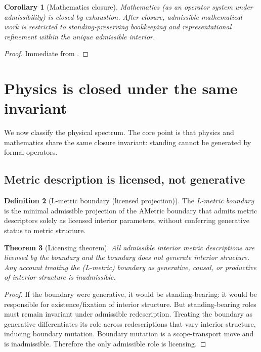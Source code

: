 \documentclass[11pt]{article}
\newtheorem{theorem}{Theorem}[section]
\newtheorem{corollary}[theorem]{Corollary}
\theoremstyle{definition}
\newtheorem{definition}[theorem]{Definition}
\begin{document}
\begin{corollary}[Mathematics closure]
\label{cor:math-closed}
Mathematics (as an operator system under admissibility) is closed by exhaustion.
After closure, admissible mathematical work is restricted to standing-preserving bookkeeping and representational refinement within the unique admissible interior.
\end{corollary}

\begin{proof}
Immediate from .
\end{proof}

\section{Physics is closed under the same invariant}
\label{sec:physics}

We now classify the physical spectrum.
The core point is that physics and mathematics share the same closure invariant: standing cannot be generated by formal operators.

\subsection{Metric description is licensed, not generative}

\begin{definition}[L-metric boundary (licensed projection)]
The \emph{L-metric boundary} is the minimal admissible projection of the AMetric boundary that admits metric descriptors solely as licensed interior parameters, without conferring generative status to metric structure.
\end{definition}

\begin{theorem}[Licensing theorem]
\label{thm:licensing}
All admissible interior metric descriptions are licensed by the boundary and the boundary does not generate interior structure.
Any account treating the (L-metric) boundary as generative, causal, or productive of interior structure is inadmissible.
\end{theorem}

\begin{proof}
If the boundary were generative, it would be standing-bearing: it would be responsible for existence/fixation of interior structure.
But standing-bearing roles must remain invariant under admissible redescription.
Treating the boundary as generative differentiates its role across redescriptions that vary interior structure, inducing boundary mutation.
Boundary mutation is a scope-transport move and is inadmissible.
Therefore the only admissible role is licensing.
\end{proof}
\end{document}

